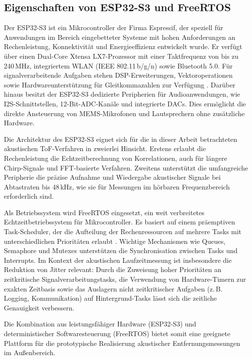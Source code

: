 \subsection{Eigenschaften von ESP32-S3 und FreeRTOS}

Der ESP32-S3 ist ein Mikrocontroller der Firma Espressif, der speziell für Anwendungen im Bereich eingebetteter Systeme mit hohen Anforderungen an Rechenleistung, Konnektivität und Energieeffizienz entwickelt wurde. Er verfügt über einen Dual-Core Xtensa LX7-Prozessor mit einer Taktfrequenz von bis zu 240\,MHz, integriertem \ac{WLAN} (\ac{IEEE} 802.11\,b/g/n) sowie \ac{Bluetooth} 5.0. Für signalverarbeitende Aufgaben stehen \ac{DSP}-Erweiterungen, Vektoroperationen sowie Hardwareunterstützung für Gleitkommazahlen zur Verfügung \cite{espressif2023esp32s3}. Darüber hinaus besitzt der ESP32-S3 dedizierte Peripherien für Audioanwendungen, wie \ac{I2S}-Schnittstellen, 12-Bit-\ac{ADC}-Kanäle und integrierte \ac{DAC}s. Dies ermöglicht die direkte Ansteuerung von \ac{MEMS}-Mikrofonen und Lautsprechern ohne zusätzliche Hardware.

Die Architektur des ESP32-S3 eignet sich für die in dieser Arbeit betrachteten akustischen \ac{ToF}-Verfahren in zweierlei Hinsicht. Erstens erlaubt die Rechenleistung die Echtzeitberechnung von Korrelationen, auch für längere Chirp-Signale und \ac{FFT}-basierte Verfahren. Zweitens unterstützt die umfangreiche Peripherie die präzise Aufnahme und Wiedergabe akustischer Signale bei Abtastraten bis 48\,kHz, wie sie für Messungen im hörbaren Frequenzbereich erforderlich sind. 

Als Betriebssystem wird FreeRTOS eingesetzt, ein weit verbreitetes Echtzeitbetriebssystem für Mikrocontroller. Es basiert auf einem präemptiven Task-Scheduler, der die Aufteilung der Rechenressourcen auf mehrere Tasks mit unterschiedlichen Prioritäten erlaubt \cite{richardbarry2022freertos}. Wichtige Mechanismen wie Queues, Semaphore und Mutexes unterstützen die Synchronisation zwischen Tasks und Interrupts. Im Kontext der akustischen Laufzeitmessung ist insbesondere die Reduktion von Jitter relevant: Durch die Zuweisung hoher Prioritäten an zeitkritische Signalverarbeitungstasks, die Verwendung von Hardware-Timern zur exakten Zeitbasis sowie das Auslagern nicht zeitkritischer Aufgaben (z.\,B. Logging, Kommunikation) auf Hintergrund-Tasks lässt sich die zeitliche Genauigkeit verbessern.

Die Kombination aus leistungsfähiger Hardware (ESP32-S3) und deterministischer Softwaresteuerung (FreeRTOS) bietet somit eine geeignete Plattform für die prototypische Realisierung akustischer Entfernungsmessungen im Außenbereich.

